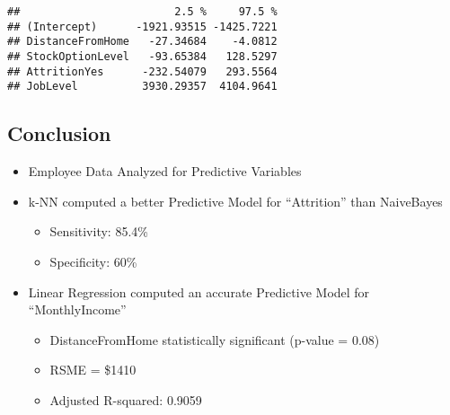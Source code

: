 \documentclass[]{article}
\providecommand{\tightlist}{%
  \setlength{\itemsep}{0pt}\setlength{\parskip}{0pt}}
\begin{document}
\begin{verbatim}
##                        2.5 %     97.5 %
## (Intercept)      -1921.93515 -1425.7221
## DistanceFromHome   -27.34684    -4.0812
## StockOptionLevel   -93.65384   128.5297
## AttritionYes      -232.54079   293.5564
## JobLevel          3930.29357  4104.9641
\end{verbatim}

\hypertarget{conclusion}{%
\subsection{Conclusion}\label{conclusion}}

\begin{itemize}
\tightlist
\item
  Employee Data Analyzed for Predictive Variables
\item
  k-NN computed a better Predictive Model for ``Attrition'' than
  NaiveBayes

  \begin{itemize}
  \tightlist
  \item
    Sensitivity: 85.4\%
  \item
    Specificity: 60\%
  \end{itemize}
\item
  Linear Regression computed an accurate Predictive Model for
  ``MonthlyIncome''

  \begin{itemize}
  \tightlist
  \item
    DistanceFromHome statistically significant (p-value = 0.08)
  \item
    RSME = \$1410
  \item
    Adjusted R-squared: 0.9059
  \end{itemize}
\end{itemize}
\end{document}
